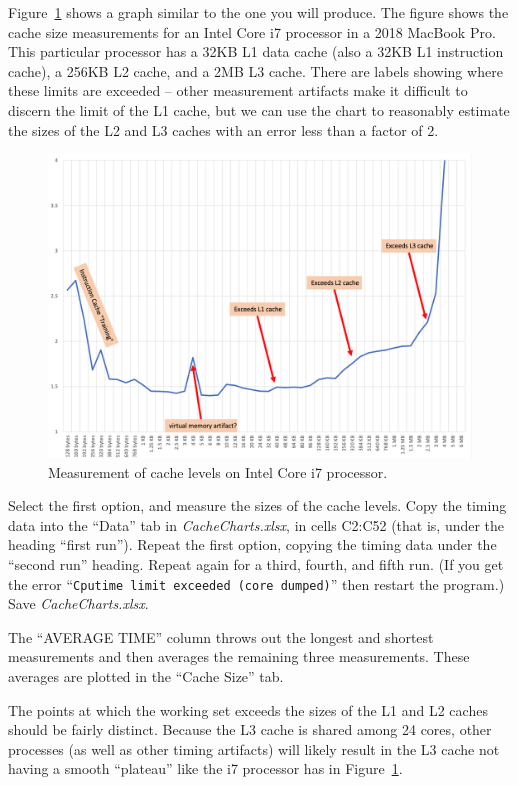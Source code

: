 Figure~\ref{fig:LaptopCache} shows a graph similar to the one you will
produce. The figure shows the cache size measurements for an Intel Core i7
processor in a 2018 MacBook Pro. This particular processor has a 32KB L1 data
cache (also a 32KB L1 instruction cache), a 256KB L2 cache, and a 2MB L3 cache.
There are labels showing where these limits are exceeded -- other measurement
artifacts make it difficult to discern the limit of the L1 cache, but we can use
the chart to reasonably estimate the sizes of the L2 and L3 caches with an error
less than a factor of 2.

\begin{figure}
    \centering
    \includegraphics[width=13cm]{IntelI7caches}
    \caption{Measurement of cache levels on Intel Core i7 processor. \label{fig:LaptopCache}}
\end{figure}

Select the first option, and measure the sizes of the cache levels. Copy the
timing data into the ``Data'' tab in \textit{CacheCharts.xlsx}, in cells C2:C52
(that is, under the heading ``first run''). Repeat the first option, copying
the timing data under the ``second run'' heading. Repeat again for a third,
fourth, and fifth run. (If you get the error ``\texttt{Cputime limit exceeded
(core dumped)}'' then restart the program.) Save \textit{CacheCharts.xlsx}.

The ``AVERAGE TIME'' column throws out the longest and shortest measurements
and then averages the remaining three measurements. These averages are plotted
in the ``Cache Size'' tab.

The points at which the working set exceeds the sizes of the L1 and L2 caches
should be fairly distinct. Because the L3 cache is shared among 24 cores, other
processes (as well as other timing artifacts) will likely result in the L3
cache not having a smooth ``plateau'' like the i7 processor has in
Figure~\ref{fig:LaptopCache}.

